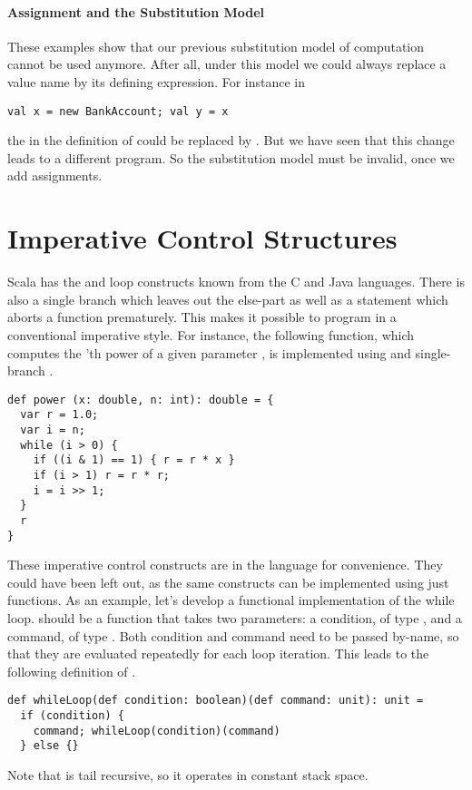 {\paragraph{Assignment and the Substitution Model}
These examples show that our previous substitution model of
computation cannot be used anymore.  After all, under this
model we could always replace a value name by its
defining expression.
For instance in
\begin{lstlisting}
val x = new BankAccount; val y = x
\end{lstlisting}
the  in the definition of  could
be replaced by .
But we have seen that this change leads to a different program.
So the substitution model must be invalid, once we add assignments. 

\section{Imperative Control Structures}

Scala has the  and  loop constructs known
from the C and Java languages. There is also a single branch 
which leaves out the else-part as well as a  statement which
aborts a function prematurely. This makes it possible to program in a
conventional imperative style. For instance, the following function,
which computes the 'th power of a given parameter , is
implemented using  and single-branch .
\begin{lstlisting}
def power (x: double, n: int): double = {
  var r = 1.0;
  var i = n;
  while (i > 0) { 
    if ((i & 1) == 1) { r = r * x }
    if (i > 1) r = r * r;
    i = i >> 1;
  }
  r
}
\end{lstlisting}
These imperative control constructs are in the language for
convenience. They could have been left out, as the same constructs can
be implemented using just functions. As an example, let's develop a
functional implementation of the while loop.  should
be a function that takes two parameters: a condition, of type
, and a command, of type . Both condition and
command need to be passed by-name, so that they are evaluated
repeatedly for each loop iteration.  This leads to the following
definition of .
\begin{lstlisting}
def whileLoop(def condition: boolean)(def command: unit): unit = 
  if (condition) {
    command; whileLoop(condition)(command)
  } else {}
\end{lstlisting}
Note that  is tail recursive, so it operates in
constant stack space.

}
